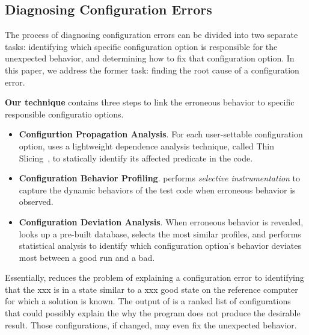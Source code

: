 





\subsection{Diagnosing Configuration Errors}

The process of diagnosing configuration errors can be divided into two
separate tasks: identifying which specific configuration option is
responsible for the unexpected behavior, and determining how to fix that
configuration option. In this paper, we address the former task: finding
the root cause of a configuration error.

\textbf{Our technique} contains three steps to 
link the erroneous behavior to specific responsible configuratio options.

\begin{itemize}
\item \textbf{Configurtion Propagation Analysis}. For
each user-settable configuration option, \ourtool
uses a lightweight dependence analysis technique, called Thin Slicing~\cite{Sridharan:2007},
to statically identify its affected predicate in the code.

\item \textbf{Configuration Behavior Profiling}. \ourtool
performs \textit{selective instrumentation} to capture the
dynamic behaviors of the test code when erroneous behavior
is observed.

\item \textbf{Configuration Deviation Analysis}.
When erroneous behavior is revealed, \ourtool looks up a
pre-built database, selects the most similar profiles, and
performs statistical analysis to identify which configuration
option's behavior deviates most between a good run and a bad.

\end{itemize}

Essentially, \ourtool reduces the problem of explaining a
configuration error to
identifying that the xxx is in a state similar to a xxx good state
on the reference computer for which a solution is known.
The output of \ourtool is a ranked list of
configurations that could possibly explain the why the program does not produce the desirable result. Those
configurations, if changed, may even fix the unexpected behavior.

